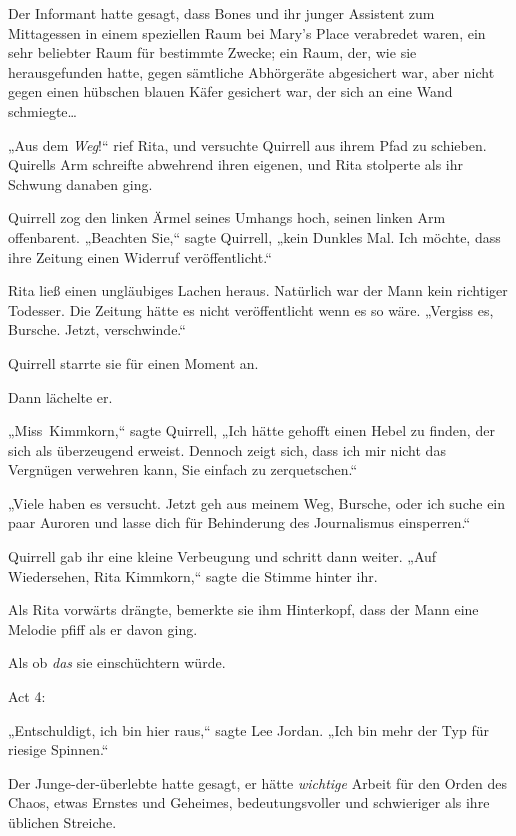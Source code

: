 {Der Informant hatte gesagt, dass Bones und ihr junger Assistent zum Mittagessen in einem speziellen Raum bei Mary's Place verabredet waren, ein sehr beliebter Raum für bestimmte Zwecke; ein Raum, der, wie sie herausgefunden hatte, gegen sämtliche Abhörgeräte abgesichert war, aber nicht gegen einen hübschen blauen Käfer gesichert war, der sich an eine Wand schmiegte…

„Aus dem \emph{Weg}!“ rief Rita, und versuchte Quirrell aus ihrem Pfad zu schieben. Quirells Arm schreifte abwehrend ihren eigenen, und Rita stolperte als ihr Schwung danaben ging.

Quirrell zog den linken Ärmel seines Umhangs hoch, seinen linken Arm offenbarent. „Beachten Sie,“ sagte Quirrell, „kein Dunkles Mal. Ich möchte, dass ihre Zeitung einen Widerruf veröffentlicht.“

Rita ließ einen ungläubiges Lachen heraus. Natürlich war der Mann kein richtiger Todesser. Die Zeitung hätte es nicht veröffentlicht wenn es so wäre. „Vergiss es, Bursche. Jetzt, verschwinde.“

Quirrell starrte sie für einen Moment an.

Dann lächelte er.

„Miss~Kimmkorn,“ sagte Quirrell, „Ich hätte gehofft einen Hebel zu finden, der sich als überzeugend erweist. Dennoch zeigt sich, dass ich mir nicht das Vergnügen verwehren kann, Sie einfach zu zerquetschen.“

„Viele haben es versucht. Jetzt geh aus meinem Weg, Bursche, oder ich suche ein paar Auroren und lasse dich für Behinderung des Journalismus einsperren.“

Quirrell gab ihr eine kleine Verbeugung und schritt dann weiter. „Auf Wiedersehen, Rita Kimmkorn,“ sagte die Stimme hinter ihr.

Als Rita vorwärts drängte, bemerkte sie ihm Hinterkopf, dass der Mann eine Melodie pfiff als er davon ging.

Als ob \emph{das} sie einschüchtern würde.

Act 4:

„Entschuldigt, ich bin hier raus,“ sagte Lee Jordan. „Ich bin mehr der Typ für riesige Spinnen.“

Der Junge-der-überlebte hatte gesagt, er hätte \emph{wichtige} Arbeit für den Orden des Chaos, etwas Ernstes und Geheimes, bedeutungsvoller und schwieriger als ihre üblichen Streiche.

}
